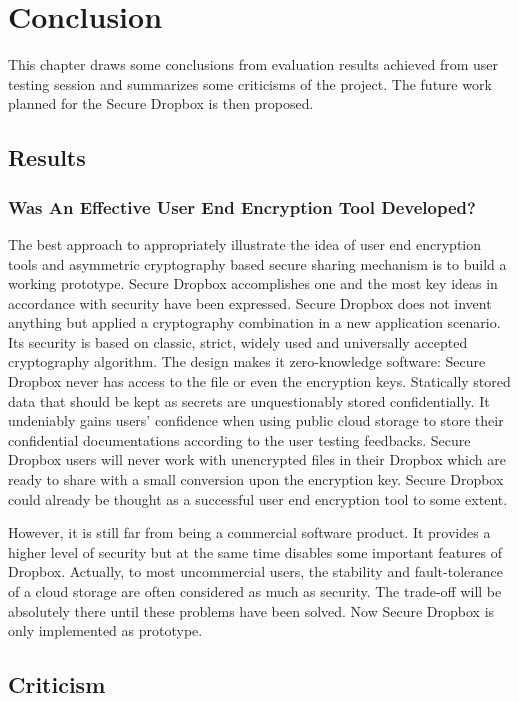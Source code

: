 \chapter{Conclusion}

This chapter draws some conclusions from evaluation results achieved from user testing session and summarizes some criticisms of the project. The future work planned for the Secure Dropbox is then proposed.

\section{Results}

\subsection{Was An Effective User End Encryption Tool Developed?}

The best approach to appropriately illustrate the idea of user end encryption tools and asymmetric cryptography based secure sharing mechanism is to build a working prototype. Secure Dropbox accomplishes one and the most key ideas in accordance with security have been expressed. Secure Dropbox does not invent anything but applied a cryptography combination in a new application scenario. Its security is based on classic, strict, widely used and universally accepted cryptography algorithm. The design makes it zero-knowledge software: Secure Dropbox never has access to the file or even the encryption keys. Statically stored data that should be kept as secrets are unquestionably stored confidentially. It undeniably gains users’ confidence when using public cloud storage to store their confidential documentations according to the user testing feedbacks. Secure Dropbox users will never work with unencrypted files in their Dropbox which are ready to share with a small conversion upon the encryption key. Secure Dropbox could already be thought as a successful user end encryption tool to some extent.

However, it is still far from being a commercial software product. It provides a higher level of security but at the same time disables some important features of Dropbox. Actually, to most uncommercial users, the stability and fault-tolerance of a cloud storage are often considered as much as security. The trade-off will be absolutely there until these problems have been solved. Now Secure Dropbox is only implemented as prototype.

\section{Criticism}

